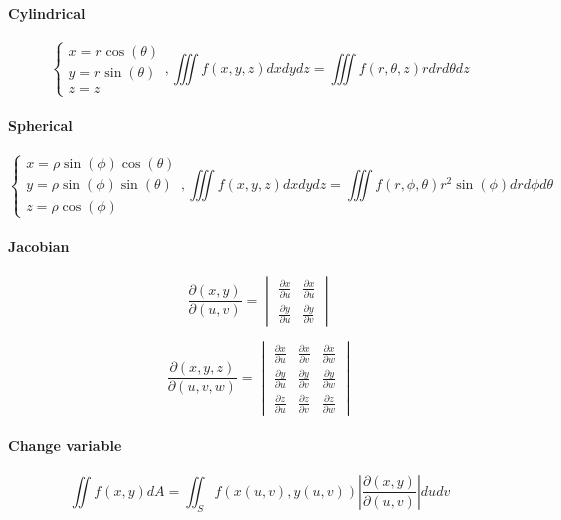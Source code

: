 \documentclass[12pt]{article}
\begin{document}
\paragraph{Cylindrical}
\[
	\begin{cases}
		x = r\cos(\theta)\\
		y = r\sin(\theta)\\
		z = z
	\end{cases},
	\iiint f(x, y, z)dxdydz = \iiint f(r, \theta, z)rdrd\theta dz
\]

\paragraph{Spherical}
\[
	\begin{cases}
		x = \rho\sin(\phi)\cos(\theta)\\
		y = \rho\sin(\phi)\sin(\theta)\\
		z = \rho\cos(\phi)
	\end{cases},
	\iiint f(x, y, z)dxdydz = \iiint f(r, \phi, \theta)r^2\sin(\phi)drd\phi d\theta 
\]

\paragraph{Jacobian}

\[\frac{\partial (x, y)}{\partial (u, v)} = 
	\begin{vmatrix}
		\frac{\partial x}{\partial u} & \frac{\partial x}{\partial u} \\ 
		\frac{\partial y}{\partial u} & \frac{\partial y}{\partial v}
	\end{vmatrix}
\]

\[\frac{\partial (x, y, z)}{\partial (u, v, w)} = 
	\begin{vmatrix}
		\frac{\partial x}{\partial u} & \frac{\partial x}{\partial v} & \frac{\partial x}{\partial w}\\ 
		\frac{\partial y}{\partial u} & \frac{\partial y}{\partial v} & \frac{\partial y}{\partial w}\\ 
		\frac{\partial z}{\partial u} & \frac{\partial z}{\partial v} & \frac{\partial z}{\partial w}
	\end{vmatrix}
\]

\paragraph{Change variable}
\[\iint f(x, y)dA = \iint_S f(x(u, v), y(u, v))|\frac{\partial (x, y)}{\partial (u, v)}|dudv\]
\end{document}
